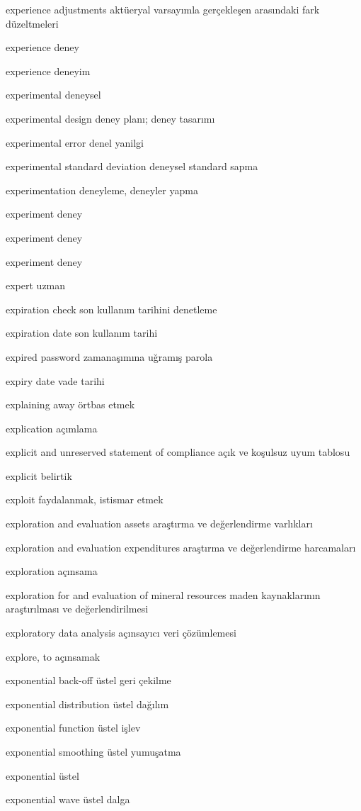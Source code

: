 \documentclass[12pt,fleqn]{article}\usepackage{../../common}
\begin{document}
experience adjustments aktüeryal varsayımla gerçekleşen arasındaki fark düzeltmeleri

experience deney

experience deneyim

experimental deneysel

experimental design deney planı; deney tasarımı

experimental error denel yanilgi

experimental standard deviation deneysel standard sapma

experimentation deneyleme, deneyler yapma

experiment deney

experiment deney

experiment deney

expert uzman

expiration check son kullanım tarihini denetleme

expiration date son kullanım tarihi

expired password zamanaşımına uğramış parola

expiry date vade tarihi

explaining away örtbas etmek

explication açımlama

explicit and unreserved statement of compliance açık ve koşulsuz uyum tablosu

explicit belirtik

exploit faydalanmak, istismar etmek

exploration and evaluation assets araştırma ve değerlendirme varlıkları

exploration and evaluation expenditures araştırma ve değerlendirme harcamaları

exploration açınsama

exploration for and evaluation of mineral resources maden kaynaklarının araştırılması ve değerlendirilmesi

exploratory data analysis açınsayıcı veri çözümlemesi

explore, to açınsamak

exponential back-off üstel geri çekilme

exponential distribution üstel dağılım

exponential function üstel işlev

exponential smoothing üstel yumuşatma

exponential üstel

exponential wave üstel dalga
\end{document}
